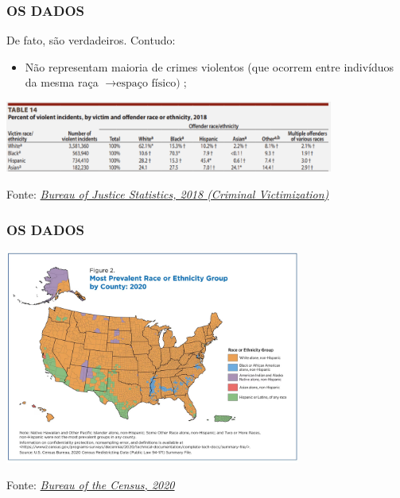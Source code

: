 \documentclass[compress,12pt]{beamer}
\begin{document}
\begin{frame}
    \frametitle{OS DADOS}
    De fato, são verdadeiros. Contudo:
    \begin{itemize}
        \item Não representam maioria de crimes violentos (que ocorrem entre indivíduos da mesma raça $\rightarrow \textrm{espaço físico)}$;
    \end{itemize}
    \centering
    \includegraphics[width=108mm]{Imagens/Table 14 (2018).png}

    Fonte: \href{https://bjs.ojp.gov/content/pub/pdf/cv18.pdf}{\textit{Bureau of Justice Statistics, 2018 (Criminal Victimization)}}
\end{frame}

\begin{frame}
    \frametitle{OS DADOS}
    \centering
    \includegraphics[width=97mm]{Imagens/2020-united-states-population-more-racially-ethnically-diverse-than-2010-figure-2.png}

    Fonte: \href{https://www.census.gov/library/stories/2021/08/2020-united-states-population-more-racially-ethnically-diverse-than-2010.html}{\textit{Bureau of the Census, 2020}}
\end{frame}
\end{document}
